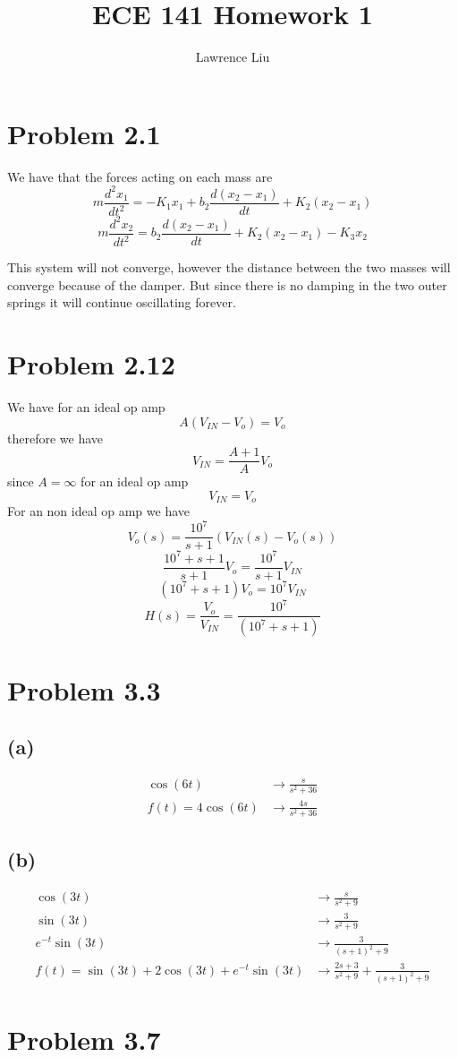 \documentclass[12pt]{article}
\title{ECE 141 Homework 1}
\author{Lawrence Liu}
\begin{document}
\maketitle
\section*{Problem 2.1}
We have that the forces acting on each mass are
$$m\frac{d^2x_1}{dt^2}=-K_1x_1+b_2\frac{d(x_2-x_1)}{dt}+K_2(x_2-x_1)$$
$$m\frac{d^2x_2}{dt^2}=b_2\frac{d(x_2-x_1)}{dt}+K_2(x_2-x_1)-K_3x_2$$

This system will not converge, however the distance between the two masses will converge because of the damper. But since there is no damping in the two outer springs it will continue oscillating forever.
\section*{Problem 2.12}
We have for an ideal op amp
$$A(V_{IN}-V_o)=V_o$$
therefore we have
$$V_{IN}=\frac{A+1}{A}V_o$$
since $A=\infty$ for an ideal op amp
$$V_{IN}=V_o$$
For an non ideal op amp we have
$$V_o(s)=\frac{10^7}{s+1}(V_{IN}(s)-V_o(s))$$
$$\frac{10^7+s+1}{s+1}V_{o}=\frac{10^7}{s+1}V_{IN}$$
$$(10^7+s+1)V_{o}=10^7V_{IN}$$
$$H(s)=\boxed{\frac{V_o}{V_{IN}}=\frac{10^7}{(10^7+s+1)}}$$
\section*{Problem 3.3}
\subsection*{(a)}
\begin{align*}
\cos(6t)&\to\frac{s}{s^2+36}\\
f(t)=4\cos(6t)&\to\boxed{\frac{4s}{s^2+36}}
\end{align*}

\subsection*{(b)}
\begin{align*}
\cos(3t)&\to\frac{s}{s^2+9}\\
\sin(3t)&\to\frac{3}{s^2+9}\\
e^{-t}\sin(3t)&\to\frac{3}{(s+1)^2+9}\\
f(t)=\sin(3t)+2\cos(3t)+e^{-t}\sin(3t)&\to\frac{2s+3}{s^2+9}+\frac{3}{(s+1)^2+9}
\end{align*}
\section*{Problem 3.7}
\end{document}
